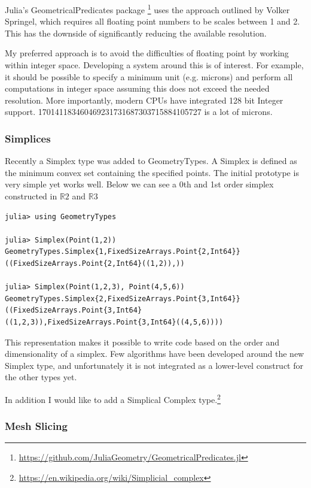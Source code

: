 \documentclass[a4paper]{article}
\begin{document}
Julia's GeometricalPredicates package \footnote{\url{https://github.com/JuliaGeometry/GeometricalPredicates.jl}}
uses the approach outlined by Volker Springel, which requires all floating point
numbers to be scales between 1 and 2.\cite{Springel_2010} This has the downside
of significantly reducing the available resolution. 

My preferred approach is to avoid the difficulties of floating point by working
within integer space. Developing a system around this is of interest. For
example, it should be possible to specify a minimum unit (e.g. microns)
and perform all computations in integer space assuming this does not exceed
the needed resolution. More importantly, modern CPUs have integrated 128 bit
Integer support. 170141183460469231731687303715884105727 is a lot of microns.

\subsubsection{Simplices}

Recently a Simplex type was added to GeometryTypes. A Simplex is defined
as the minimum convex set containing the specified points. The initial
prototype is very simple yet works well. Below we can see a 0th and 1st order
simplex constructed in $\mathbb{R}2$ and $\mathbb{R}3$
\begin{lstlisting}
julia> using GeometryTypes

julia> Simplex(Point(1,2))
GeometryTypes.Simplex{1,FixedSizeArrays.Point{2,Int64}}((FixedSizeArrays.Point{2,Int64}((1,2)),))

julia> Simplex(Point(1,2,3), Point(4,5,6))
GeometryTypes.Simplex{2,FixedSizeArrays.Point{3,Int64}}((FixedSizeArrays.Point{3,Int64}((1,2,3)),FixedSizeArrays.Point{3,Int64}((4,5,6))))
\end{lstlisting}

This representation makes it possible to write code based on the order and
dimensionality of a simplex. Few algorithms have been developed around the
new Simplex type, and unfortunately it is not integrated as a lower-level
construct for the other types yet.

In addition I would like to add a Simplical Complex type.\footnote{\url{https://en.wikipedia.org/wiki/Simplicial_complex}}

\subsubsection{Mesh Slicing}
\end{document}
